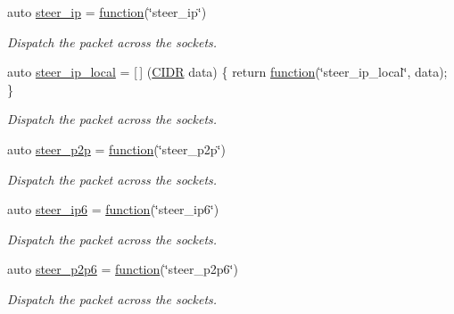 \begin{DoxyCompactItemize}
auto \hyperlink{namespacepfq_1_1lang_1_1anonymous__namespace_02default_8hpp_03_afe1c69c555a75021f7e637086cb1264c}{steer\+\_\+ip} = \hyperlink{namespacepfq_1_1lang_a1a4638059d700ae08d0ca63886ff2bb3}{function}(\char`\"{}steer\+\_\+ip\char`\"{})
\begin{DoxyCompactList}\small\item\em Dispatch the packet across the sockets. \end{DoxyCompactList}\item 
auto \hyperlink{namespacepfq_1_1lang_1_1anonymous__namespace_02default_8hpp_03_a573c7621db324727daedc11fd27ab709}{steer\+\_\+ip\+\_\+local} = \mbox{[}$\,$\mbox{]} (\hyperlink{structpfq_1_1lang_1_1CIDR}{C\+I\+DR} data) \{ return \hyperlink{namespacepfq_1_1lang_a1a4638059d700ae08d0ca63886ff2bb3}{function}(\char`\"{}steer\+\_\+ip\+\_\+local\char`\"{}, data); \}
\begin{DoxyCompactList}\small\item\em Dispatch the packet across the sockets. \end{DoxyCompactList}\item 
auto \hyperlink{namespacepfq_1_1lang_1_1anonymous__namespace_02default_8hpp_03_a93e5f91a2b955269de017225cf62e711}{steer\+\_\+p2p} = \hyperlink{namespacepfq_1_1lang_a1a4638059d700ae08d0ca63886ff2bb3}{function}(\char`\"{}steer\+\_\+p2p\char`\"{})
\begin{DoxyCompactList}\small\item\em Dispatch the packet across the sockets. \end{DoxyCompactList}\item 
auto \hyperlink{namespacepfq_1_1lang_1_1anonymous__namespace_02default_8hpp_03_a02291b124a4aa900d78797e386517f69}{steer\+\_\+ip6} = \hyperlink{namespacepfq_1_1lang_a1a4638059d700ae08d0ca63886ff2bb3}{function}(\char`\"{}steer\+\_\+ip6\char`\"{})
\begin{DoxyCompactList}\small\item\em Dispatch the packet across the sockets. \end{DoxyCompactList}\item 
auto \hyperlink{namespacepfq_1_1lang_1_1anonymous__namespace_02default_8hpp_03_a53212b58bc49e8eab255da084295b015}{steer\+\_\+p2p6} = \hyperlink{namespacepfq_1_1lang_a1a4638059d700ae08d0ca63886ff2bb3}{function}(\char`\"{}steer\+\_\+p2p6\char`\"{})
\begin{DoxyCompactList}\small\item\em Dispatch the packet across the sockets. \end{DoxyCompactList}\item 

\end{DoxyCompactItemize}
